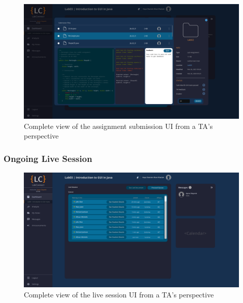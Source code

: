 \documentclass[a4paper, 12pt]{article}
\begin{document}
    \begin{figure}[H]
        \centering
        \includegraphics[width=\textwidth]{ta_assignment_submission}
        \caption{Complete view of the assignment submission UI from a TA's perspective}
        \label{fig:student_assignment_submission_full}
    \end{figure}
    
    
    
    
    
    
    
    
    
    
    
    
    
    
    \pagebreak
    
    \subsubsection{Ongoing Live Session}
     
    \begin{figure}[H]
        \centering
        \includegraphics[width=\textwidth]{ta_live_session}
        \caption{Complete view of the live session UI from a TA's perspective}
        \label{fig:ta_live_session_full}
    \end{figure}
    
\end{document}
